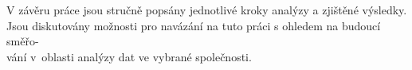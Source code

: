 V závěru práce jsou stručně popsány jednotlivé kroky analýzy a zjištěné výsledky. Jsou diskutovány možnosti pro navázání na tuto práci s ohledem na budoucí směřo-\\vání v~oblasti analýzy dat ve vybrané společnosti.




